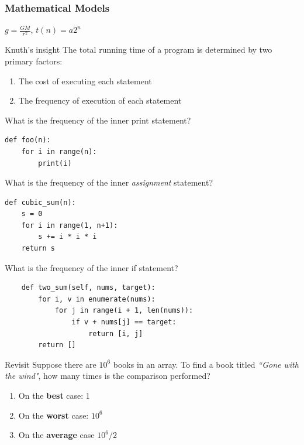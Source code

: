 \documentclass[aspectratio=169, 14pt]{beamer}
\begin{document}
\begin{frame}
    \frametitle{Mathematical Models}
\(g = \frac{GM}{r^2}\), \(t(n) = a2^{n}\)

\begin{exampleblock}{Knuth's insight}
The total running time of a program is determined by two primary factors:
\begin{enumerate}
    \item The cost of executing each statement
    \item The frequency of execution of each statement
\end{enumerate}
\end{exampleblock}

\end{frame}

\begin{frame}[fragile]
What is the frequency of the inner \alert{print} statement?
\begin{verbatim}
def foo(n):
    for i in range(n):
        print(i)
\end{verbatim}
What is the frequency of the inner \emph{assignment} statement?
\begin{verbatim}
def cubic_sum(n):
    s = 0
    for i in range(1, n+1):
        s += i * i * i
    return s
\end{verbatim}
\end{frame}

\begin{frame}[fragile]
    What is the frequency of the inner \alert{if} statement?
    \begin{verbatim}
    def two_sum(self, nums, target):
        for i, v in enumerate(nums):
            for j in range(i + 1, len(nums)):
                if v + nums[j] == target:
                    return [i, j]
        return []
    \end{verbatim}
    

\end{frame}

\begin{frame}
    \begin{block}{Revisit}
        Suppose there are $10^6$ books in an array. To find a book titled \emph{``Gone with the wind"}, how many times is the comparison performed?
        \begin{enumerate}
            \item On the \textbf{best} case: 1 
            \item On the \textbf{worst} case: $10^6$
            \item On the \textbf{average} case $10^6/2$
        \end{enumerate}
    \end{block}
\end{frame}
\end{document}
